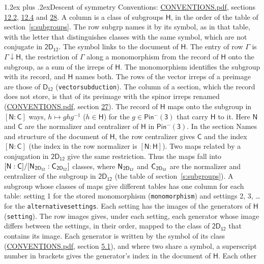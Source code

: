 \documentclass[10pt,a4paper]{article}
\makeatletter
\renewcommand\section{\@startsection{section}{1}{\z@}{-3ex plus -1ex minus -.2ex}%
  {1.2ex plus .2ex}{\normalfont\large\sffamily\bfseries\color{parttitle}}}
\numberwithin{equation}{section}
\newcommand{\grp}[1]{\mathsf{#1}}
\newcommand{\grpindex}[2]{[#1 : #2]}
\newcommand{\restr}[2]{#1\!\downarrow#2}
\newcommand{\hairsp}{\mkern1mu}
\makeatother
\begin{document}
\section{Descent of symmetry}\label{s:subduction}
Conventions: \href{../../CONVENTIONS.pdf}{CONVENTIONS.pdf}, sections \href{../../../rotation/CONVENTIONS.pdf\#conv.12.2}{12.2}, \href{../../../rotation/CONVENTIONS.pdf\#conv.12.4}{12.4} and \href{../../CONVENTIONS.pdf\#conv.28}{28}.
A column is a class of subgroups $\grp{H}$, in the order of the table of section~\ref{s:subgroups}. The row subgrp names it by its symbol, as in that table, with the letter that distinguishes classes with the same symbol, which are not conjugate in $\grp{2D_{12}}$. The symbol links to the document of $\grp{H}$. The entry of row $\Gamma$ is $\restr{\Gamma}{\grp{H}}$, the restriction of $\Gamma$ along a monomorphism from the record of $\grp{H}$ onto the subgroup, as a sum of the irreps of $\grp{H}$. The monomorphism identifies the subgroup with its record, and $\grp{H}$ names both. The rows of the vector irreps of a preimage are those of \href{../../../rotation/data/pdf/D12.pdf}{$\grp{D_{12}}$} (\texttt{vectorsubduction}). The column of a section, which the record does not store, is that of its preimage with the spinor irreps renamed (\href{../../CONVENTIONS.pdf}{CONVENTIONS.pdf}, section \href{../../CONVENTIONS.pdf\#conv.27}{27}). \label{n:group.normalizer.o3}\label{n:group.centralizer.o3}\label{n:element.h}The record of $\grp{H}$ maps onto the subgroup in $\grpindex{\grp{N}}{\grp{C}}$ ways, $h \mapsto g h g^{-1}$ ($h \in \grp{H}$) for the $g \in \grp{Pin^{-}(3)}$ that carry $\grp{H}$ to it. Here $\grp{N}$ and $\grp{C}$ are the normalizer and centralizer of $\grp{H}$ in \href{Pinminus3.pdf}{$\grp{Pin^{-}(3)}$}. In the section Names and structure of the document of $\grp{H}$, the row centralizer gives $\grp{C}$ and the index $\grpindex{\grp{N}}{\grp{C}}$ (the index in the row normalizer is $\grpindex{\grp{N}}{\grp{H}}$). Two maps related by a conjugation in $\grp{2D_{12}}$ give the same restriction. Thus the maps fall into $\grpindex{\grp{N}}{\grp{C}}/\grpindex{\grp{N}_{\hairsp \grp{2D_{12}}}}{\grp{C}_{\hairsp \grp{2D_{12}}}}$ classes, where $\grp{N}_{\hairsp \grp{2D_{12}}}$ and $\grp{C}_{\hairsp \grp{2D_{12}}}$ are the normalizer and centralizer of the subgroup in $\grp{2D_{12}}$ (the table of section~\ref{s:subgroups}). \label{n:head.setting}A subgroup whose classes of maps give different tables has one column for each table: setting 1 for the stored monomorphism (\texttt{monomorphism}) and settings 2, 3, \dots{} for the \texttt{alternativesettings}. Each setting has the images of the generators of $\grp{H}$ (\texttt{setting}). \label{n:head.images}The row images gives, under each setting, each generator whose image differs between the settings, in their order, mapped to the class of $\grp{2D_{12}}$ that contains its image. \label{n:element.generator.index}Each generator is written by the symbol of its class (\href{../../CONVENTIONS.pdf}{CONVENTIONS.pdf}, section \href{../../../rotation/CONVENTIONS.pdf\#conv.5.1}{5.1}), and where two share a symbol, a superscript number in brackets gives the generator's index in the document of $\grp{H}$. \label{n:irrep.Delta}Each other 
\end{document}
